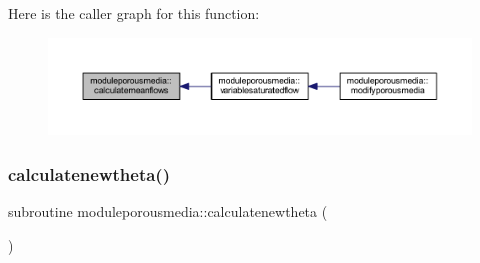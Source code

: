 Here is the caller graph for this function\+:\nopagebreak
\begin{figure}[H]
\begin{center}
\leavevmode
\includegraphics[width=350pt]{namespacemoduleporousmedia_a25f85d61b730aa85aca7f9dded8b38b5_icgraph}
\end{center}
\end{figure}
\mbox{\label{namespacemoduleporousmedia_a659c3fab21d457aee320269fbc101787}} 
\subsubsection{\texorpdfstring{calculatenewtheta()}{calculatenewtheta()}}
{\footnotesize\ttfamily subroutine moduleporousmedia\+::calculatenewtheta (\begin{DoxyParamCaption}{ }\end{DoxyParamCaption})\hspace{0.3cm}{\ttfamily [private]}}

